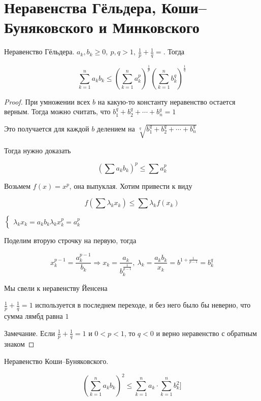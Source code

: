 \section{Неравенства Гёльдера, Коши–Буняковского и Минковского}

\begin{theorem}
    Неравенство Гёльдера. 
    $a_k, b_k \geq 0,\ p, q > 1,\ \frac{1}{p}+\frac{1}{q} = $. Тогда
    
    \[ \sum_{k=1}^{n} a_k b_k \leq \left( \sum_{k=1}^{n} a_k^p\right)^\frac{1}{p} \left( \sum_{k=1}^{n} b_k^q\right)^\frac{1}{q} \]
\end{theorem}

\begin{proof}
    При умножении всех $b$ на какую-то константу неравенство остается верным. Тогда можно считать, что $b_1^q+b_2^q+\cdots+b_n^q=1$

    Это получается для каждой $b$ делением на $\sqrt[q]{b_1^q+b_2^q+\cdots+b_n^q}$

    Тогда нужно доказать

    \[ \left(\sum a_k b_k \right)^p \leq \sum a_k^p \]

    Возьмем $f(x) = x^p$, она выпуклая. Хотим привести к виду

    \[ f(\sum \lambda_k x_k) \leq \sum \lambda_k f(x_k) \]

    $
    \begin{cases}
        \lambda_k x_k = a_k b_k
        \lambda_k x_k^p = a_k^p
    \end{cases}
    $

    Поделим вторую строчку на первую, тогда

    \[ x_k^{p-1} = \frac{a_k^{p-1}}{b_k} \Rightarrow x_k = \frac{a_k}{b_k^{\frac{1}{p-1}}},\ 
    \lambda_k = \frac{a_k b_k}{x_k} = b^{1+\frac{1}{p-1}} = b_k^q\]

    Мы свели к неравенству Йенсена

    $\frac{1}{p}+\frac{1}{q} = 1$ используется в последнем переходе, и без него было бы неверно, что сумма лямбд равна $1$

    Замечание. Если $\frac{1}{p}+\frac{1}{q} = 1$ и $0 < p < 1$, то $q < 0$ и верно неравенство с обратным знаком

\end{proof}

\begin{theorem}
    Неравенство Коши–Буняковского.

    \[ (\sum_{k=1}^{n} a_k b_k)^2 \leq \sum_{k=1}^{n} a_k \cdot \sum_{k=1}^{n}b_k^2]\]
\end{theorem}

